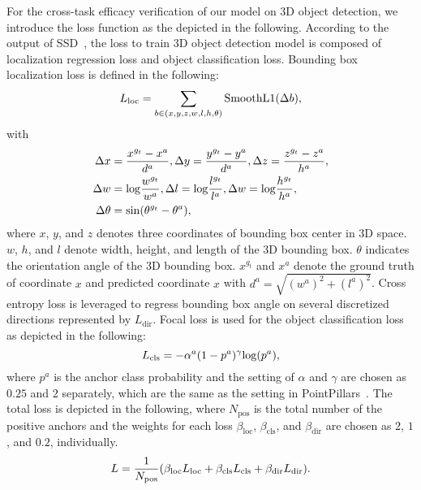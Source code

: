 \documentclass[lettersize,journal]{IEEEtran}
\begin{document}
For the cross-task efficacy verification of our model on 3D object detection, we introduce the loss function as the depicted in the following.
According to the output of SSD~\cite{liu2016ssd}, the loss to train 3D object detection model is composed of localization regression loss and object classification loss. Bounding box localization loss is defined in the following:
\begin{equation}
\centering
    L_{\mathrm{loc}}=\sum_{b\in(x,y,z,w,l,h,\theta)}\mathrm{SmoothL1}(\Delta b),
\end{equation}
with
\begin{equation}
\begin{split}
\centering
    \Delta x&=\frac{x^{g_t} - x^a}{d^a}, \Delta y=\frac{y^{g_t}-y^a}{d^a}, \Delta z=\frac{z^{g_t}-z^a}{h^a},\\
    \Delta w&=\mathrm{log}\frac{w^{g_t}}{w^a}, \Delta l=\mathrm{log}\frac{l^{g_t}}{l^a}, \Delta w=\mathrm{log}\frac{h^{g_t}}{h^a},\\
    \Delta \theta &= \mathrm{sin}(\theta^{g_t}-\theta^a),
\end{split}
\end{equation}
where $x$, $y$, and $z$ denotes three coordinates of bounding box center in 3D space. $w$, $h$, and $l$ denote width, height, and length of the 3D bounding box. $\theta$ indicates the orientation angle of the 3D bounding box. $x^{g_t}$ and $x^a$ denote the ground truth of coordinate $x$ and predicted coordinate $x$ with $d^a=\sqrt{(w^a)^2+(l^a)^2}$.
Cross entropy loss is leveraged to regress bounding box angle on several discretized directions represented by $L_\mathrm{dir}$.
Focal loss is used for the object classification loss as depicted in the following:
\begin{equation}
\centering
    L_{\mathrm{cls}}=-\alpha^a(1-p^a)^\gamma \mathrm{\mathrm{log}}(p^a),
\end{equation}
where $p^a$ is the anchor class probability and the setting of $\alpha$ and $\gamma$ are chosen as $0.25$ and $2$ separately, which are the same as the setting in PointPillars~\cite{pointpillars}.
The total loss is depicted in the following, where $N_{\mathrm{pos}}$ is the total number of the positive anchors and the weights for each loss $\beta_{\mathrm{loc}}$, $\beta_{\mathrm{cls}}$, and $\beta_{\mathrm{dir}}$ are chosen as $2$, $1$, and $0.2$, individually.
\begin{equation}
\centering
    L=\frac{1}{N_{\mathrm{pos}}}(\beta_{\mathrm{loc}}L_{\mathrm{loc}}+\beta_{\mathrm{cls}}L_{\mathrm{cls}}+\beta_{\mathrm{dir}}L_{\mathrm{dir}}).
\end{equation}
\end{document}
